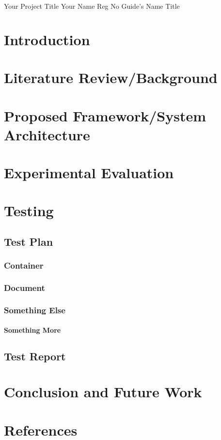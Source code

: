 \documentclass{vitmsprojectreport}
\begin{document}
\maketitlepage%
{Your Project Title}%
{Your Name}%
{Reg No}%
{Guide's Name}%
{Title}%

\makedeclarationpage%

\tableofcontents  %
\clearpage
\listoffigures    %
\clearpage
\listoftables     %
\clearpage

\chapter{Introduction}

\chapter{Literature Review/Background}

\chapter{Proposed Framework/System Architecture}

\chapter{Experimental Evaluation}

\chapter{Testing}

\section{Test Plan}

\subsection{Container}

\subsection{Document}

\subsection{Something Else}

\subsubsection{Something More}

\section{Test Report}

\chapter{Conclusion and Future Work}

\chapter{References}
\end{document}
